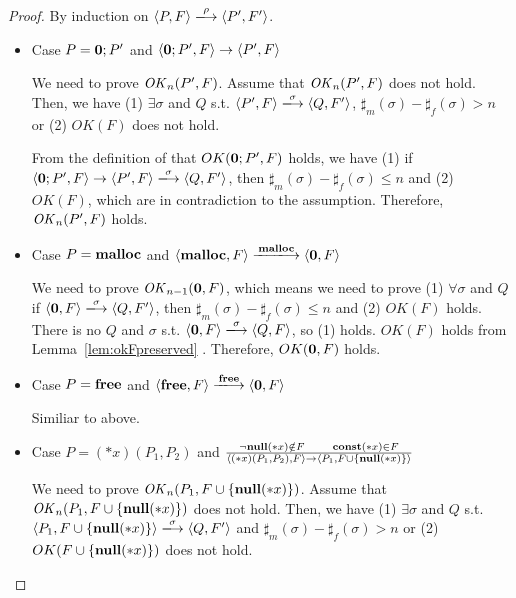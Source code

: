\begin{proof}
By induction on \(\langle P, F \rangle \xlongrightarrow{\rho} \langle P', F' \rangle \).

\begin{itemize}

\item Case \(P = {\bf 0};P'\) and \( \langle {\bf 0};P', F \rangle \rightarrow \langle P', F \rangle\)

  We need to prove \(\mathit{OK}_n(P', F)\).  Assume that \(\mathit{OK}_n(P', F)\)
  does not hold. Then, we have (1) \( \exists \sigma \) and \(Q\) s.t. \(
  \langle P', F \rangle \xlongrightarrow{\sigma} \langle Q, F' \rangle
  \), \(\sharp_{m}(\sigma) - \sharp_{f}(\sigma) > n\) or (2) \(
  OK(F)\) does not hold.

  From the definition of that \(OK({\bf 0};P', F)\) holds, we have (1)
  if \( \langle {\bf 0};P', F \rangle \rightarrow \langle P', F
  \rangle \xlongrightarrow{\sigma} \langle Q, F' \rangle \), then
  \(\sharp_m(\sigma) - \sharp_f(\sigma) \le n \) and (2) \(OK(F)\),
  which are in contradiction to the assumption. Therefore, \(\mathit{OK}_n(P',
  F)\) holds.

\item Case \(P = \mathbf{malloc}\) and \( \langle \Malloc, F \rangle \xlongrightarrow{\Malloc} \langle {\bf 0}, F \rangle\)

  We need to prove \(\mathit{OK}_{n-1}({\bf 0}, F)\), which means we need to
  prove (1) \( \forall \sigma \) and \(Q\) if \( \langle {\bf 0}, F
  \rangle \xlongrightarrow{\sigma} \langle Q, F' \rangle \), then \(\sharp_{m}(\sigma) - \sharp_{f}(\sigma) \le n\)
  and (2) \( OK(F)\) holds.  There is no \(Q\) and \(\sigma\)
  s.t. \(\langle {\bf 0}, F \rangle \xlongrightarrow{\sigma} \langle
  Q, F \rangle \), so (1) holds.  \(OK(F)\) holds from
  Lemma~\ref{lem:okFpreserved} . Therefore, \(OK({\bf 0}, F)\) holds.
  
\item Case \(P = \mathbf{free}\) and \(\langle \Free, F \rangle \xlongrightarrow{\Free} \langle {\bf 0}, F \rangle \)

  Similiar to above.

\item Case \( P = (*x)(P_1,P_2) \) and \( \frac{\neg{\bf null}(*x) \notin F
      \quad\quad \mathbf{const}(*x) \in F} { \langle (*x)(P_1, P_2), F \rangle
      \rightarrow \langle P_1, F\cup \{{\bf null}(*x) \} \rangle } \) 

  We need to prove \(\mathit{OK}_n(P_1, F\cup\{{\bf null}(*x)\})\).  Assume that
  \(\mathit{OK}_n(P_1, F\cup\{{\bf null}(*x)\})\) does not hold. Then, we have (1) \(
  \exists \sigma \) and \(Q\) s.t. \( \langle P_1, F\cup\{\snull\}
  \rangle \xlongrightarrow{\sigma} \langle Q, F' \rangle \) and \(\sharp_{m}(\sigma) - \sharp_{f}(\sigma) > n\) or
  (2) \( OK(F\cup\{{\bf null}(*x)\})\) does not hold.


\end{itemize}
\end{proof}
